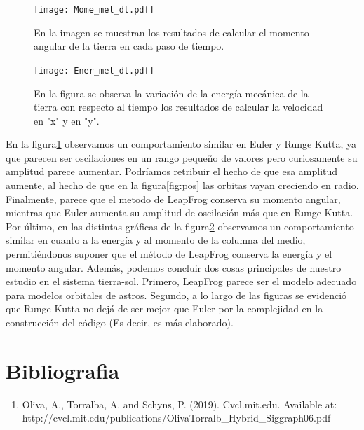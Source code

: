 \documentclass{article}
\begin{document}
\begin{figure}[H]
    \centering
    \texttt{[image: Mome\_met\_dt.pdf]}
    \caption{En la imagen se muestran los resultados de calcular el momento angular de la tierra en cada paso de tiempo.}
    \label{fig:Mome}
\end{figure}

\begin{figure}[H]
    \centering
    \texttt{[image: Ener\_met\_dt.pdf]}
    \caption{En la figura se observa la variación de la energía mecánica de la tierra con respecto al tiempo los resultados de calcular la velocidad en "x" y en "y".}
    \label{fig:Ene}
\end{figure}
 
En la figura\ref{fig:Mome} observamos un comportamiento similar en Euler y Runge Kutta, ya que parecen ser oscilaciones en un rango pequeño de valores pero curiosamente su amplitud parece aumentar. Podríamos retribuir el hecho de que esa amplitud aumente, al hecho de que en la figura\ref{fig:pos} las orbitas vayan creciendo en radio. Finalmente, parece que el metodo de LeapFrog conserva su momento angular, mientras que Euler aumenta su amplitud de oscilación más que en Runge Kutta.\\

Por último, en las distintas gráficas de la figura\ref{fig:Ene} observamos un comportamiento similar en cuanto a la energía y al momento de la columna del medio, permitiéndonos suponer que el método de LeapFrog conserva la energía y el momento angular. Además, podemos concluir dos cosas principales de nuestro estudio en el sistema tierra-sol. Primero, LeapFrog parece ser el modelo adecuado para modelos orbitales de astros. Segundo, a lo largo de las figuras se evidenció que Runge Kutta no dejá de ser mejor que Euler por la complejidad en la construcción del código (Es decir, es más elaborado).   






\section{Bibliografia}
\begin{enumerate}
     \item  Oliva, A., Torralba, A. and Schyns, P. (2019). Cvcl.mit.edu. Available at:\\ http://cvcl.mit.edu/publications/OlivaTorralb\_Hybrid\_Siggraph06.pdf 
\end{enumerate}
   
\end{document}
